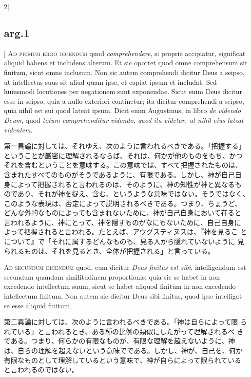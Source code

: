 \documentclass[paper=a4paper,fontsize=10pt,jafontsize=9pt,titlepage]{jlreq}
\begin{document}
\begin{paracol}{2}[\subsection{arg.1}]
{\scshape Ad primum ergo dicendum} quod {\itshape comprehendere}, si
proprie accipiatur, significat aliquid habens et includens alterum. Et
sic oportet quod omne comprehensum sit finitum, sicut omne
inclusum. Non sic autem comprehendi dicitur Deus a seipso, ut
intellectus suus sit aliud quam ipse, et capiat ipsum et includat. Sed
huiusmodi locutiones per negationem sunt exponendae. Sicut enim Deus
dicitur esse in seipso, quia a nullo exteriori continetur; ita dicitur
comprehendi a seipso, quia nihil est sui quod lateat ipsum. Dicit enim
Augustinus, in libro {\itshape de videndo Deum}, quod {\itshape totum
comprehenditur videndo, quod ita videtur, ut nihil eius lateat
videntem}.

\switchcolumn

第一異論に対しては、それゆえ、次のように言われるべきである。「把握する」
ということが厳密に理解されるならば、それは、何かが他のものをもち、かつ
それを含むということを意味する。この意味では、すべて把握されたものは、
含まれたすべてのものがそうであるように、有限である。しかし、神が自己自
身によって把握されると言われるのは、そのように、神の知性が神と異なるも
のであり、それが神を捉え、含む、というような意味ではない。そうではなく、
このような表現は、否定によって説明されるべきである。つまり、ちょうど、
どんな外的なものによっても含まれないために、神が自己自身において在ると
言われるように、神にとって、神を隠すものがなにもないために、自己自身に
よって把握されると言われる。たとえば、アウグスティヌスは、『神を見るこ
とについて』で「それに属するどんなものも、見る人から隠れていないように
見られるものは、それを見るとき、全体が把握される」と言っている。

\switchcolumn*[\subsection{ad.2}]

{\scshape Ad secundum dicendum} quod, cum dicitur {\itshape Deus
finitus est sibi}, intelligendum est secundum quandam similitudinem
proportionis; quia sic se habet in non excedendo intellectum suum,
sicut se habet aliquod finitum in non excedendo intellectum
finitum. Non autem sic dicitur Deus sibi finitus, quod ipse intelligat
se esse aliquid finitum.

\switchcolumn

第二異論に対しては、次のように言われるべきである。「神は自らによって限
られている」と言われるとき、ある種の比例の類似にしたがって理解されるべ
きである。つまり、何らかの有限なものが、有限な理解を超えないように、神
は、自らの理解を超えないという意味でである。しかし、神が、自己を、何か
有限なものとして理解しているという意味で、神が自らによって限られている
と言われるのではない。

\end{paracol}
\end{document}

